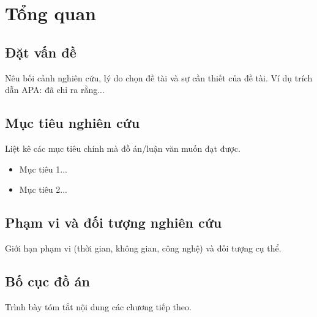 
\chapter{Tổng quan}

\section{Đặt vấn đề}
Nêu bối cảnh nghiên cứu, lý do chọn đề tài và sự cần thiết của đề tài. Ví dụ trích dẫn APA: \textcite{example_book_2024} đã chỉ ra rằng...

\section{Mục tiêu nghiên cứu}
Liệt kê các mục tiêu chính mà đồ án/luận văn muốn đạt được.

\begin{itemize}
    \item Mục tiêu 1...
    \item Mục tiêu 2...
\end{itemize}

\section{Phạm vi và đối tượng nghiên cứu}
Giới hạn phạm vi (thời gian, không gian, công nghệ) và đối tượng cụ thể.

\section{Bố cục đồ án}
Trình bày tóm tắt nội dung các chương tiếp theo.
